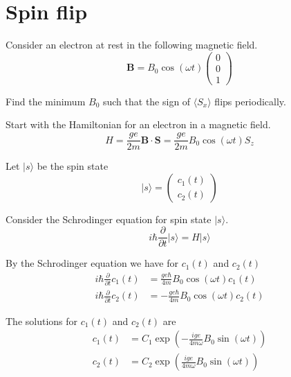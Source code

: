 

\section*{Spin flip}

Consider an electron at rest in the following magnetic field.
\begin{equation*}
\mathbf B=B_0\cos(\omega t)\begin{pmatrix}0\\0\\1\end{pmatrix}
\end{equation*}

Find the minimum $B_0$ such that the sign of $\langle S_x\rangle$
flips periodically.

\bigskip
Start with the Hamiltonian for an electron in a magnetic field.
\begin{equation*}
H=\frac{ge}{2m}\mathbf B\cdot\mathbf S
=\frac{ge}{2m}B_0\cos(\omega t)S_z
\end{equation*}

Let $|s\rangle$ be the spin state
\begin{equation*}
|s\rangle=\begin{pmatrix}c_1(t)\\c_2(t)\end{pmatrix}
\end{equation*}

Consider the Schrodinger equation for spin state $|s\rangle$.
\begin{equation*}
i\hbar\frac{\partial}{\partial t}|s\rangle=H|s\rangle
\end{equation*}

By the Schrodinger equation we have for $c_1(t)$ and $c_2(t)$
\begin{align*}
i\hbar\frac{\partial}{\partial t}c_1(t)&=\frac{ge\hbar}{4m}B_0\cos(\omega t)c_1(t)
\\
i\hbar\frac{\partial}{\partial t}c_2(t)&=-\frac{ge\hbar}{4m}B_0\cos(\omega t)c_2(t)
\end{align*}

The solutions for $c_1(t)$ and $c_2(t)$ are
\begin{equation*}
\begin{aligned}
c_1(t)&=C_1\exp\left(-\frac{ige}{4m\omega}B_0\sin(\omega t)\right)
\\
c_2(t)&=C_2\exp\left(\frac{ige}{4m\omega}B_0\sin(\omega t)\right)
\end{aligned}
\tag{1}
\end{equation*}

